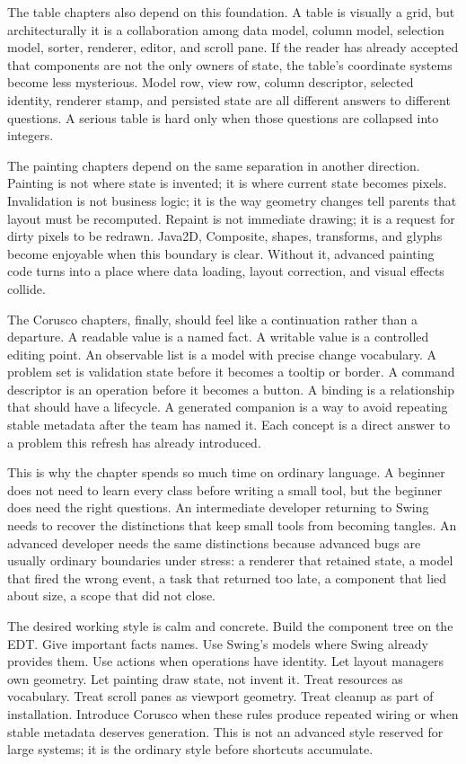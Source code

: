 The table chapters also depend on this foundation. A table is visually a grid,
but architecturally it is a collaboration among data model, column model,
selection model, sorter, renderer, editor, and scroll pane. If the reader has
already accepted that components are not the only owners of state, the table's
coordinate systems become less mysterious. Model row, view row, column
descriptor, selected identity, renderer stamp, and persisted state are all
different answers to different questions. A serious table is hard only when
those questions are collapsed into integers.

The painting chapters depend on the same separation in another direction.
Painting is not where state is invented; it is where current state becomes
pixels. Invalidation is not business logic; it is the way geometry changes tell
parents that layout must be recomputed. Repaint is not immediate drawing; it is
a request for dirty pixels to be redrawn. Java2D, Composite, shapes, transforms,
and glyphs become enjoyable when this boundary is clear. Without it, advanced
painting code turns into a place where data loading, layout correction, and
visual effects collide.

The Corusco chapters, finally, should feel like a continuation rather than a
departure. A readable value is a named fact. A writable value is a controlled
editing point. An observable list is a model with precise change vocabulary. A
problem set is validation state before it becomes a tooltip or border. A command
descriptor is an operation before it becomes a button. A binding is a
relationship that should have a lifecycle. A generated companion is a way to
avoid repeating stable metadata after the team has named it. Each concept is a
direct answer to a problem this refresh has already introduced.

This is why the chapter spends so much time on ordinary language. A beginner
does not need to learn every class before writing a small tool, but the beginner
does need the right questions. An intermediate developer returning to Swing
needs to recover the distinctions that keep small tools from becoming tangles.
An advanced developer needs the same distinctions because advanced bugs are
usually ordinary boundaries under stress: a renderer that retained state, a
model that fired the wrong event, a task that returned too late, a component
that lied about size, a scope that did not close.

The desired working style is calm and concrete. Build the component tree on the
EDT. Give important facts names. Use Swing's models where Swing already provides
them. Use actions when operations have identity. Let layout managers own
geometry. Let painting draw state, not invent it. Treat resources as vocabulary.
Treat scroll panes as viewport geometry. Treat cleanup as part of installation.
Introduce Corusco when these rules produce repeated wiring or when stable
metadata deserves generation. This is not an advanced style reserved for large
systems; it is the ordinary style before shortcuts accumulate.

